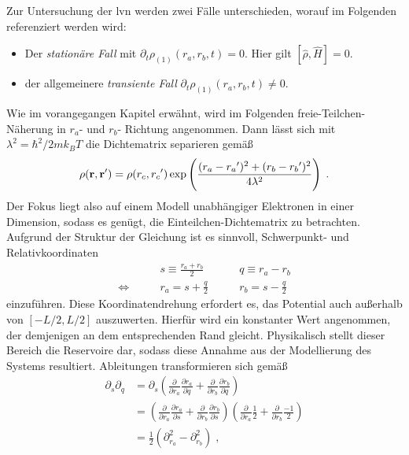 Zur Untersuchung der \ac{lvn} werden zwei Fälle unterschieden, worauf im Folgenden referenziert werden wird:
\begin{itemize}
  \item Der \emph{stationäre Fall} mit $\partial_t \rho_{(1)}({r_a},{r_b},t) = 0$. Hier gilt ${\left[\hat{\rho} , \hat{H}\right]=0}$.
  \item der allgemeinere \emph{transiente Fall} $\partial_t \rho_{(1)}({r_a},{r_b},t) \neq 0$.
\end{itemize}
Wie im vorangegangen Kapitel erwähnt, wird im Folgenden freie-Teilchen-Näherung in ${r_a}$- und ${r_b}$- Richtung angenommen. Dann lässt sich mit $\lambda^2 = \hbar^2/2mk_B T$ die Dichtematrix separieren \cite{grubin1993transport} gemäß
\begin{equation}
  \rho(\vb{r},\vb{r}') = \rho({r_c},{r_c}') \exp\left( \frac{({r_a}-{r_a}')^2 + ({r_b}-{r_b}')^2}{4\lambda^2}\right) \; .
\end{equation}
Der Fokus liegt also auf einem Modell unabhängiger Elektronen in einer Dimension, sodass es genügt, die Einteilchen-Dichtematrix zu betrachten.
Aufgrund der Struktur der Gleichung ist es sinnvoll, Schwerpunkt- und Relativkoordinaten
\begin{equation}
  \begin{aligned}
    &s \equiv \frac{{r_a}+{r_b}}{2} \qquad &q \equiv {r_a}-{r_b} \\
    \Leftrightarrow\qquad &{r_a} = s+\frac{q}{2} \qquad &{r_b} = s-\frac{q}{2}
  \end{aligned}
  \label{eq:gedrehteKoordinaten}
\end{equation}
einzuführen. Diese Koordinatendrehung erfordert es, das Potential auch außerhalb von $[-L/2, L/2]$ auszuwerten. Hierfür wird ein konstanter Wert angenommen, der demjenigen an dem entsprechenden Rand gleicht. Physikalisch stellt dieser Bereich die Reservoire dar, sodass diese Annahme aus der Modellierung des Systems resultiert.
Ableitungen transformieren sich gemäß
\begin{equation*}
  \begin{aligned}
    \partial_s \partial_q  &= \partial_s \left( \frac{\partial}{\partial {r_a}} \frac{\partial {r_a}}{\partial q} + \frac{\partial}{\partial {r_b}} \frac{\partial {r_b}}{\partial q}\right) \\
     &= \left( \frac{\partial}{\partial {r_a}} \frac{\partial {r_a}}{\partial s} + \frac{\partial}{\partial {r_b}} \frac{\partial {r_b}}{\partial s}\right) \left( \frac{\partial}{\partial {r_a}} \frac{1}{2} + \frac{\partial}{\partial {r_b}} \frac{-1}{2}\right)\\
    &=  \frac{1}{2}(\partial_{r_a}^2 - \partial_{r_b}^2) \; ,
  \end{aligned}
\end{equation*}
